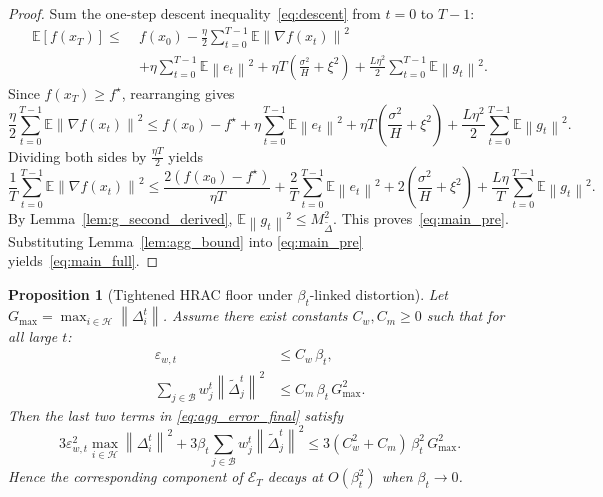 \documentclass[11pt,a4paper]{article}
\newtheorem{proposition}{Proposition}
\theoremstyle{remark}
\newcommand{\E}{\mathbb{E}}
\newcommand{\HH}{\mathcal{H}}
\newcommand{\BB}{\mathcal{B}}
\newcommand{\norm}[1]{\left\lVert #1 \right\rVert}
\begin{document}
\begin{proof}
Sum the one-step descent inequality~\eqref{eq:descent} from \(t=0\) to
\(T-1\):
\begin{align*}
    \E[f(x_T)]
    \le\;&
    f(x_0)
    -
    \frac{\eta}{2}\sum_{t=0}^{T-1}\E\norm{\nabla f(x_t)}^2
    \\
    &+
    \eta\sum_{t=0}^{T-1}\E\norm{e_t}^2
    +
    \eta T\left(\frac{\sigma^2}{H}+\xi^2\right)
    +
    \frac{L\eta^2}{2}\sum_{t=0}^{T-1}\E\norm{g_t}^2.
\end{align*}
Since \(f(x_T)\ge f^\star\), rearranging gives
\[
    \frac{\eta}{2}\sum_{t=0}^{T-1}\E\norm{\nabla f(x_t)}^2
    \le
    f(x_0)-f^\star
    +
    \eta\sum_{t=0}^{T-1}\E\norm{e_t}^2
    +
    \eta T\left(\frac{\sigma^2}{H}+\xi^2\right)
    +
    \frac{L\eta^2}{2}\sum_{t=0}^{T-1}\E\norm{g_t}^2.
\]
Dividing both sides by \(\frac{\eta T}{2}\) yields
\[
    \frac{1}{T}\sum_{t=0}^{T-1}\E\norm{\nabla f(x_t)}^2
    \le
    \frac{2(f(x_0)-f^\star)}{\eta T}
    +
    \frac{2}{T}\sum_{t=0}^{T-1}\E\norm{e_t}^2
    +
    2\left(\frac{\sigma^2}{H}+\xi^2\right)
    +
    \frac{L\eta}{T}\sum_{t=0}^{T-1}\E\norm{g_t}^2.
\]
By Lemma~\ref{lem:g_second_derived}, \(\E\norm{g_t}^2 \le M_{\tilde\Delta}^2\).
This proves~\eqref{eq:main_pre}.
Substituting Lemma~\ref{lem:agg_bound} into \eqref{eq:main_pre}
yields~\eqref{eq:main_full}.
\end{proof}

\begin{proposition}[Tightened HRAC floor under \(\beta_t\)-linked distortion]
\label{prop:tight_floor_beta2}
Let $G_{\max} = \max_{i\in\HH}\norm{\Delta_i^t}$. Assume there exist constants \(C_w,C_m\ge 0\) such that for all large
\(t\):
\begin{align}
    \varepsilon_{w,t} &\le C_w\,\beta_t,
    \label{eq:tight_epsw_beta}\\
    \sum_{j\in\BB} w_j^t \norm{\tilde{\Delta}_j^t}^2
    &\le C_m\,\beta_t\,G_{\max}^2.
    \label{eq:tight_byz_energy}
\end{align}
Then the last two terms in \eqref{eq:agg_error_final} satisfy
\begin{equation}
    3\varepsilon_{w,t}^2 \max_{i\in\HH}\norm{\Delta_i^t}^2
    +
    3\beta_t \sum_{j\in\BB} w_j^t \norm{\tilde{\Delta}_j^t}^2
    \le
    3(C_w^2+C_m)\,\beta_t^2\,G_{\max}^2.
    \label{eq:tight_beta2_floor}
\end{equation}
Hence the corresponding component of \(\mathcal E_T\) decays at
\(O(\beta_t^2)\) when \(\beta_t\to 0\).
\end{proposition}
\end{document}
